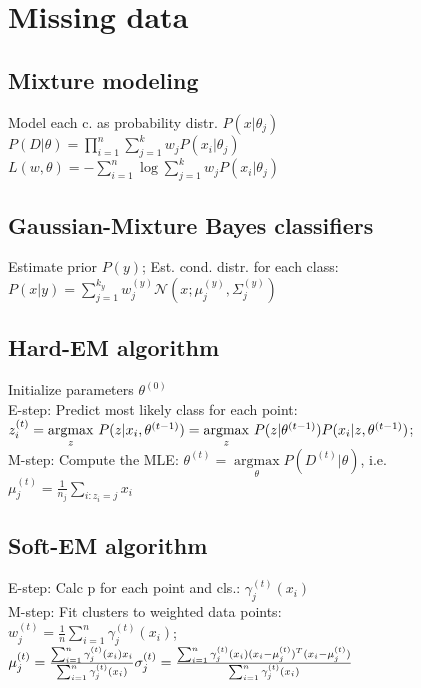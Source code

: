 \section*{Missing data}
\subsection*{Mixture modeling}

Model each c. as probability distr. $P(x|\theta_j)$\\
$P(D|\theta) = \prod_{i=1}^n \sum_{j=1}^k w_j P(x_i|\theta_j)$\\
$L(w, \theta) = - \sum_{i=1}^n \operatorname{log}  \sum_{j=1}^k w_j P(x_i| \theta_j)$

\subsection*{Gaussian-Mixture Bayes classifiers}
Estimate prior $P(y)$; Est. cond. distr. for each class:
$P(x|y) = \sum_{j=1}^{k_y} w_j^{(y)} \mathcal{N}(x; \mu_j^{(y)}, \Sigma_j^{(y)})$\\

\subsection*{Hard-EM algorithm}
Initialize parameters $\theta^{(0)}$\\
E-step: Predict most likely class for each point:
$z_i^{(t)} = \underset{z}{\operatorname{argmax}} ~ P(z|x_i, \theta^{(t-1)})\\
= \underset{z}{\operatorname{argmax}} ~ P(z|\theta^{(t-1)}) P(x_i|z,\theta^{(t-1)})$;\\
M-step: Compute the MLE: $\theta^{(t)} = \underset{\theta}{\operatorname{argmax}} P(D^{(t)}|\theta)$, i.e. $\mu_j^{(t)} = \frac{1}{n_j} \sum_{i: z_i = j} x_i$

\subsection*{Soft-EM algorithm}
E-step: Calc p for each point and cls.: $\gamma_j^{(t)}(x_i)$\\
M-step: Fit clusters to weighted data points:\\
$w_j^{(t)} = \frac{1}{n} \sum_{i=1}^n \gamma_j^{(t)} (x_i)$; 
$\mu_j^{(t)} = \frac{\sum_{i=1}^n \gamma_j^{(t)} (x_i) x_i}{\sum_{i=1}^n \gamma_j^{(t)} (x_i)}\\ %
\sigma_j^{(t)} = \frac{\sum_{i=1}^n \gamma_j^{(t)}(x_i) (x_i - \mu_j^{(t)})^T (x_i - \mu_j^{(t)})}{\sum_{i=1}^n \gamma_j^{(t)}(x_i)}$

